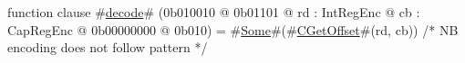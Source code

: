 function clause #\hyperref[sailMIPSzdecode]{decode}# (0b010010 @ 0b01101 @ rd : IntRegEnc @ cb : CapRegEnc @ 0b00000000 @ 0b010) = #\hyperref[sailMIPSzSome]{Some}#(#\hyperref[sailMIPSzCGetOffset]{CGetOffset}#(rd, cb)) /* NB encoding does not follow pattern */
